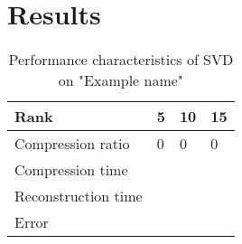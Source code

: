\section{Results}
\label{section:results}

\begin{table}[ht]
\centering
\begin{tabular}{l l l l}
\hline
\textbf{Rank} & \textbf{5} & \textbf{10} & \textbf{15}\\
\hline
Compression ratio & 0 & 0 & 0 \\
Compression time \\
Reconstruction time \\
Error \\
\hline
\end{tabular}
\caption{Performance characteristics of SVD on "Example name"}
\end{table}


